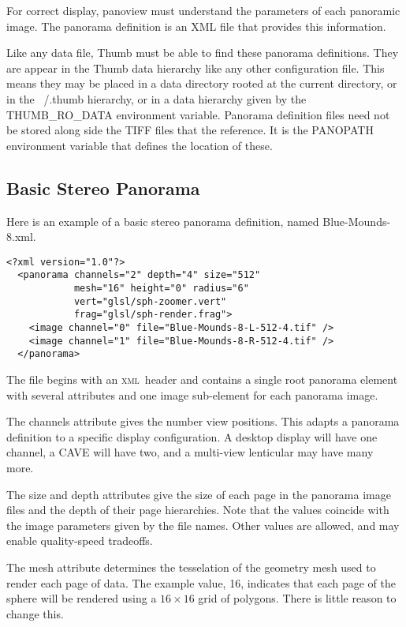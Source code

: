 \documentclass[article,oneside,11pt]{memoir}
\newcommand{\xml}     {\textsc{xml}}
\begin{document}
\begin{Spacing}{1.1}
For correct display, panoview must understand the parameters of each panoramic image. The panorama definition is an XML file that provides this information.

Like any data file, Thumb must be able to find these panorama definitions. They are appear in the Thumb data hierarchy like any other configuration file. This means they may be placed in a data directory rooted at the current directory, or in the ~/.thumb hierarchy, or in a data hierarchy given by the THUMB\_RO\_DATA environment variable. Panorama definition files need not be stored along side the TIFF files that the reference. It is the PANOPATH environment variable that defines the location of these.

\subsection{Basic Stereo Panorama}

Here is an example of a basic stereo panorama definition, named Blue-Mounds-8.xml.

\begin{verbatim}
<?xml version="1.0"?>
  <panorama channels="2" depth="4" size="512"
            mesh="16" height="0" radius="6"
            vert="glsl/sph-zoomer.vert"
            frag="glsl/sph-render.frag">
    <image channel="0" file="Blue-Mounds-8-L-512-4.tif" />
    <image channel="1" file="Blue-Mounds-8-R-512-4.tif" />
  </panorama>
\end{verbatim}

The file begins with an \xml\ header and contains a single root panorama element with several attributes and one image sub-element for each panorama image.

The channels attribute gives the number view positions. This adapts a panorama definition to a specific display configuration. A desktop display will have one channel, a CAVE will have two, and a multi-view lenticular may have many more.

The size and depth attributes give the size of each page in the panorama image files and the depth of their page hierarchies. Note that the values coincide with the image parameters given by the file names. Other values are allowed, and may enable quality-speed tradeoffs.

The mesh attribute determines the tesselation of the geometry mesh used to render each page of data. The example value, 16, indicates that each page of the sphere will be rendered using a $16\times 16$ grid of polygons. There is little reason to change this.


\end{Spacing}
\end{document}

